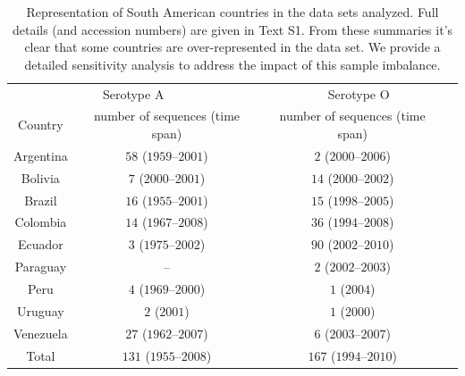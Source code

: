\documentclass[a4paper,10pt]{article}
\begin{document}
\begin{table}[H]
 \caption{
 Representation of South American countries in the data sets analyzed.
 Full details (and accession numbers) are given in Text S1.
 From these summaries it's clear that some countries are over-represented in the data set.
 We provide a detailed sensitivity analysis to address the impact of this sample imbalance.
 }
 \begin{center}
 \begin{tabular}{cccc}
 \toprule
   \multicolumn{2}{c}{Serotype A}& \multicolumn{2}{c}{Serotype O}\\
 Country & number of sequences (time span)& number of sequences (time span) & \\ 
  \midrule
Argentina & $58$ ($1959$--$2001$)& $2$ ($2000$--$2006$)  \\
Bolivia   & $7$ ($2000$--$2001$)& $14$ ($2000$--$2002$)  \\
Brazil    & $16$ ($1955$--$2001$)& $15$ ($1998$--$2005$)  \\
Colombia  & $14$ ($1967$--$2008$)& $36$ ($1994$--$2008$)  \\
Ecuador   & $3$ ($1975$--$2002$)& $90$ ($2002$--$2010$)  \\
Paraguay                    & --& $2$ ($2002$--$2003$)  \\
Peru      & $4$ ($1969$--$2000$)& $1$ ($2004$)  \\
Uruguay   & $2$ ($2001$)& $1$ ($2000$)  \\
Venezuela & $27$ ($1962$--$2007$)& $6$ ($2003$--$2007$)  \\
Total     & $131$ ($1955$--$2008$) & $167$ ($1994$--$2010$)\\
  \bottomrule
 \end{tabular}
 \end{center}
\label{stab:reps}
\end{table}
\end{document}

